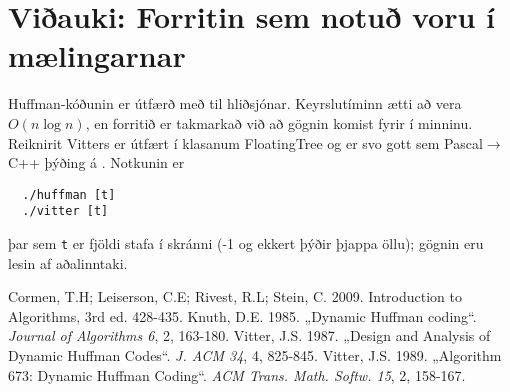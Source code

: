 \documentclass[a4paper,icelandic]{article}
\theoremstyle{default}
\theoremstyle{definition}
\theoremstyle{remark}
\begin{document}
\section*{Viðauki: Forritin sem notuð voru í mælingarnar}

Huffman-kóðunin er útfærð með \cite{mitAlgo} til hliðsjónar.
Keyrslutíminn ætti að vera $O(n\log n)$, en forritið er takmarkað við að
gögnin komist fyrir í minninu. Reiknirit Vitters er útfært í klasanum
FloatingTree og er svo gott sem Pascal$\to$C++ þýðing á \cite{vitter89}.
Notkunin er 
\begin{lstlisting}
  ./huffman [t]
  ./vitter [t]
\end{lstlisting}
þar sem \texttt{t} er fjöldi stafa í skránni (-1 og ekkert þýðir þjappa
öllu); gögnin eru lesin af aðalinntaki.





\begin{thebibliography}{9}
   Cormen, T.H; Leiserson, C.E; Rivest, R.L; Stein, C.
    2009. Introduction to Algorithms, 3rd ed. 428-435.
   Knuth, D.E. 1985. „Dynamic Huffman coding“.
    \emph{Journal of Algorithms 6}, 2, 163-180.
  Vitter, J.S. 1987. „Design and Analysis of Dynamic
    Huffman Codes“. \emph{J. ACM 34}, 4, 825-845.
   Vitter, J.S. 1989. „Algorithm 673: Dynamic Huffman
    Coding“.  \emph{ACM Trans. Math. Softw. 15}, 2, 158-167.
\end{thebibliography}
\end{document}
